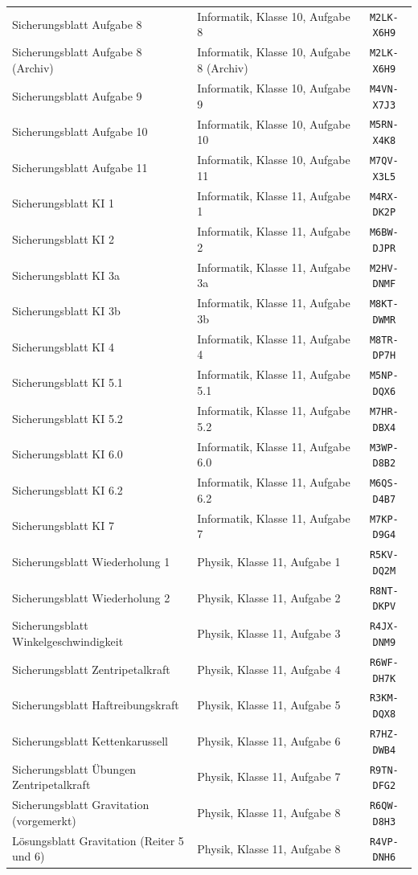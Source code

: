 \documentclass[10pt,a4paper]{article}
\begin{document}
\begin{center}
\begin{tabular}{l l c}
Sicherungsblatt Aufgabe 8 & Informatik, Klasse 10, Aufgabe 8 &
\texttt{M2LK-X6H9} \\
Sicherungsblatt Aufgabe 8 (Archiv) & Informatik, Klasse 10, Aufgabe 8 (Archiv) &
\texttt{M2LK-X6H9} \\
Sicherungsblatt Aufgabe 9 & Informatik, Klasse 10, Aufgabe 9 &
\texttt{M4VN-X7J3} \\
Sicherungsblatt Aufgabe 10 & Informatik, Klasse 10, Aufgabe 10 &
\texttt{M5RN-X4K8} \\
Sicherungsblatt Aufgabe 11 & Informatik, Klasse 10, Aufgabe 11 &
\texttt{M7QV-X3L5} \\
Sicherungsblatt KI 1 & Informatik, Klasse 11, Aufgabe 1 &
\texttt{M4RX-DK2P} \\
Sicherungsblatt KI 2 & Informatik, Klasse 11, Aufgabe 2 &
\texttt{M6BW-DJPR} \\
Sicherungsblatt KI 3a & Informatik, Klasse 11, Aufgabe 3a &
\texttt{M2HV-DNMF} \\
Sicherungsblatt KI 3b & Informatik, Klasse 11, Aufgabe 3b &
\texttt{M8KT-DWMR} \\
Sicherungsblatt KI 4 & Informatik, Klasse 11, Aufgabe 4 &
\texttt{M8TR-DP7H} \\
Sicherungsblatt KI 5.1 & Informatik, Klasse 11, Aufgabe 5.1 &
\texttt{M5NP-DQX6} \\
Sicherungsblatt KI 5.2 & Informatik, Klasse 11, Aufgabe 5.2 &
\texttt{M7HR-DBX4} \\
Sicherungsblatt KI 6.0 & Informatik, Klasse 11, Aufgabe 6.0 &
\texttt{M3WP-D8B2} \\
Sicherungsblatt KI 6.2 & Informatik, Klasse 11, Aufgabe 6.2 &
\texttt{M6QS-D4B7} \\
Sicherungsblatt KI 7 & Informatik, Klasse 11, Aufgabe 7 &
\texttt{M7KP-D9G4} \\
Sicherungsblatt Wiederholung 1 & Physik, Klasse 11, Aufgabe 1 &
\texttt{R5KV-DQ2M} \\
Sicherungsblatt Wiederholung 2 & Physik, Klasse 11, Aufgabe 2 &
\texttt{R8NT-DKPV} \\
Sicherungsblatt Winkelgeschwindigkeit & Physik, Klasse 11, Aufgabe 3 &
\texttt{R4JX-DNM9} \\
Sicherungsblatt Zentripetalkraft & Physik, Klasse 11, Aufgabe 4 &
\texttt{R6WF-DH7K} \\
Sicherungsblatt Haftreibungskraft & Physik, Klasse 11, Aufgabe 5 &
\texttt{R3KM-DQX8} \\
Sicherungsblatt Kettenkarussell & Physik, Klasse 11, Aufgabe 6 &
\texttt{R7HZ-DWB4} \\
Sicherungsblatt Übungen Zentripetalkraft & Physik, Klasse 11, Aufgabe 7 &
\texttt{R9TN-DFG2} \\
Sicherungsblatt Gravitation (vorgemerkt) & Physik, Klasse 11, Aufgabe 8 &
\texttt{R6QW-D8H3} \\
Lösungsblatt Gravitation (Reiter 5 und 6) & Physik, Klasse 11, Aufgabe 8 &
\texttt{R4VP-DNH6} \\
\bottomrule
\end{tabular}
\end{center}
\end{document}

